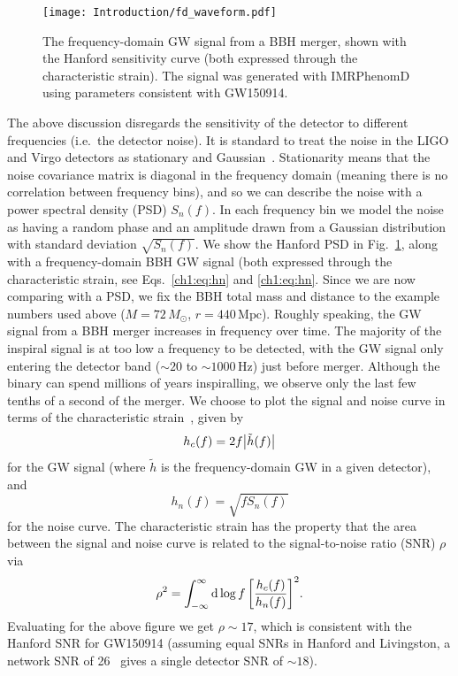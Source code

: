 \begin{figure}
    \centering
    \texttt{[image: Introduction/fd\_waveform.pdf]}
    \caption[The frequency-domain gravitational-wave signal from a binary black-hole merger]{ 
    The frequency-domain GW signal from a BBH merger, shown with the Hanford sensitivity curve (both expressed through the characteristic strain). 
    The signal was generated with IMRPhenomD using parameters consistent with GW150914.
    }
    \label{ch1:fig:fd_waveform}
\end{figure}

The above discussion disregards the sensitivity of the detector to different frequencies (i.e.\ the detector noise).
It is standard to treat the noise in the LIGO and Virgo detectors as stationary and Gaussian~\cite{LIGOScientific:2019hgc}.
Stationarity means that the noise covariance matrix is diagonal in the frequency domain (meaning there is no correlation between frequency bins), and so we can describe the noise with a power spectral density (PSD) $S_n(f)$.
In each frequency bin we model the noise as having a random phase and an amplitude drawn from a Gaussian distribution with standard deviation $\sqrt{S_n(f)}$.
We show the Hanford PSD in Fig.~\ref{ch1:fig:fd_waveform}, along with a frequency-domain BBH GW signal (both expressed through the characteristic strain, see Eqs.~\ref{ch1:eq:hn} and \ref{ch1:eq:hn}.
Since we are now comparing with a PSD, we fix the BBH total mass and distance to the example numbers used above ($M = 72\,M_\odot$, $r = 440\,\mathrm{Mpc}$).
Roughly speaking, the GW signal from a BBH merger increases in frequency over time.
The majority of the inspiral signal is at too low a frequency to be detected, with the GW signal only entering the detector band ($\sim 20$ to $\sim 1000\,\mathrm{Hz}$) just before merger.
Although the binary can spend millions of years inspiralling, we observe only the last few tenths of a second of the merger.
We choose to plot the signal and noise curve in terms of the characteristic strain~\cite{Moore:2014lga}, given by
\begin{equation}\label{ch1:eq:hc}
    h_c(f) = 2f\abs{\tilde{h}(f)}
\end{equation}
for the GW signal (where $\tilde{h}$ is the frequency-domain GW in a given detector), and
\begin{equation}\label{ch1:eq:hn}
    h_n(f) = \sqrt{fS_n(f)}
\end{equation}
for the noise curve.
The characteristic strain has the property that the area between the signal and noise curve is related to the signal-to-noise ratio (SNR) $\rho$ via
\begin{equation}
    \rho^2 = \int_{-\infty}^\infty \dd{\log{f}} \qty[\frac{h_c(f)}{h_n(f)}]^2.
\end{equation}
Evaluating for the above figure we get $\rho \sim 17$, which is consistent with the Hanford SNR for GW150914 (assuming equal SNRs in Hanford and Livingston, a network SNR of 26~\cite{LIGOScientific:2021usb} gives a single detector SNR of $\sim 18$).

